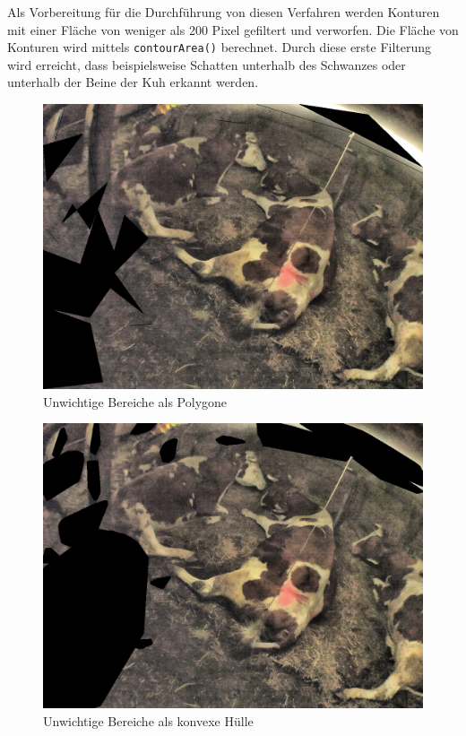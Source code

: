 Als Vorbereitung für die Durchführung von diesen Verfahren werden Konturen mit einer Fläche von weniger als 200 Pixel gefiltert und verworfen. Die Fläche von Konturen wird mittels \texttt{contourArea()} berechnet. Durch diese erste Filterung wird erreicht, dass beispielsweise Schatten unterhalb des Schwanzes oder unterhalb der Beine der Kuh erkannt werden.
\begin{figure}[H]
	\center
	\includegraphics[scale=0.43]{Grafiken/entwicklung/7unwichtigePolygone.jpg}
	\caption{Unwichtige Bereiche als Polygone } 
	\label{fig: Unwichtige Bereiche als Polygone}
\end{figure}


\begin{figure}[H]
	\center
	\includegraphics[scale=0.43]{Grafiken/entwicklung/7unwichtigeKonvexe.jpg}
	\caption{Unwichtige Bereiche als konvexe Hülle} 
	\label{fig: Unwichtige Bereiche als konvexe Hülle}
\end{figure}


